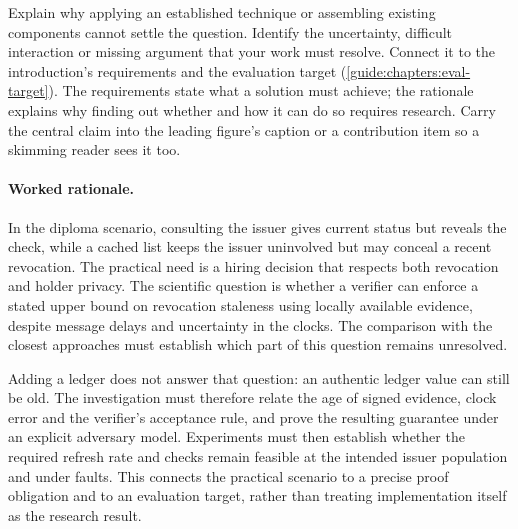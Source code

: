 Explain why applying an established technique or assembling existing components cannot settle the question. Identify the uncertainty, difficult interaction or missing argument that your work must resolve. Connect it to the introduction's requirements and the evaluation target (\cref{guide:chapters:eval-target}). The requirements state what a solution must achieve; the rationale explains why finding out whether and how it can do so requires research. Carry the central claim into the leading figure's caption or a contribution item so a skimming reader sees it too.

\paragraph{Worked rationale.} In the diploma scenario, consulting the issuer gives current status but reveals the check, while a cached list keeps the issuer uninvolved but may conceal a recent revocation. The practical need is a hiring decision that respects both revocation and holder privacy. The scientific question is whether a verifier can enforce a stated upper bound on revocation staleness using locally available evidence, despite message delays and uncertainty in the clocks. The comparison with the closest approaches must establish which part of this question remains unresolved.

Adding a ledger does not answer that question: an authentic ledger value can still be old. The investigation must therefore relate the age of signed evidence, clock error and the verifier's acceptance rule, and prove the resulting guarantee under an explicit adversary model. Experiments must then establish whether the required refresh rate and checks remain feasible at the intended issuer population and under faults. This connects the practical scenario to a precise proof obligation and to an evaluation target, rather than treating implementation itself as the research result.

